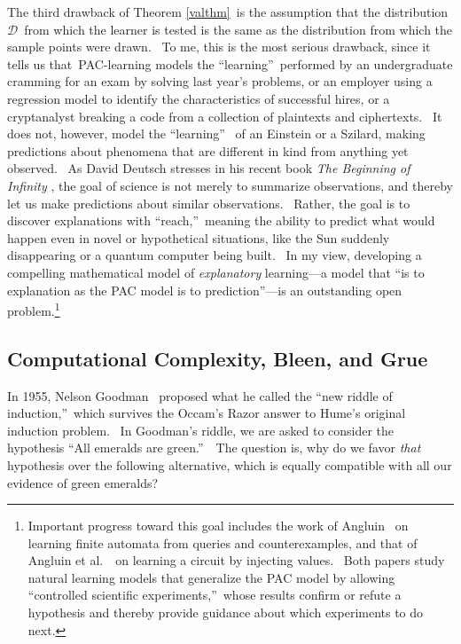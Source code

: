 \documentclass[11pt,onecolumn]{article}%
\begin{document}
The third drawback of Theorem \ref{valthm}\ is the assumption that the
distribution $\mathcal{D}$\ from which the learner is tested is the same as
the distribution from which the sample points were drawn. \ To me, this is the
most serious drawback, since it tells us that\ PAC-learning models the
\textquotedblleft learning\textquotedblright\ performed by an undergraduate
cramming for an exam by solving last year's problems, or an employer using a
regression model to identify the characteristics of successful hires, or a
cryptanalyst breaking a code from a collection of plaintexts and ciphertexts.
\ It does not, however, model the \textquotedblleft learning\textquotedblright%
\ of an Einstein or a Szilard, making predictions about phenomena that are
different in kind from anything yet observed. \ As David Deutsch stresses in
his recent book \textit{The Beginning of Infinity} \cite{deutsch:infinity},
the goal of science is not merely to summarize observations, and thereby let
us make predictions about similar observations. \ Rather, the goal is to
discover explanations with \textquotedblleft reach,\textquotedblright\ meaning
the ability to predict what would happen even in novel or hypothetical
situations, like the Sun suddenly disappearing or a quantum computer being
built. \ In my view, developing a compelling mathematical model of
\textit{explanatory} learning---a model that \textquotedblleft is to
explanation as the PAC model is to prediction\textquotedblright---is an
outstanding open problem.\footnote{Important progress toward this goal
includes the work of Angluin \cite{angluin}\ on learning finite automata from
queries and counterexamples, and that of Angluin et al.\ \cite{aacw}\ on
learning a circuit by injecting values. \ Both papers study natural learning
models that generalize the PAC model by allowing \textquotedblleft controlled
scientific experiments,\textquotedblright\ whose results confirm or refute a
hypothesis and thereby provide guidance about which experiments to do next.}

\subsection{Computational Complexity, Bleen, and Grue\label{GRUE}}

In 1955, Nelson Goodman \cite{goodman}\ proposed what he called the
\textquotedblleft new riddle of induction,\textquotedblright\ which survives
the Occam's Razor answer to Hume's original induction problem. \ In Goodman's
riddle, we are asked to consider the hypothesis \textquotedblleft All emeralds
are green.\textquotedblright\ \ The question is, why do we favor \textit{that}
hypothesis over the following alternative, which is equally compatible with
all our evidence of green emeralds?
\end{document}
